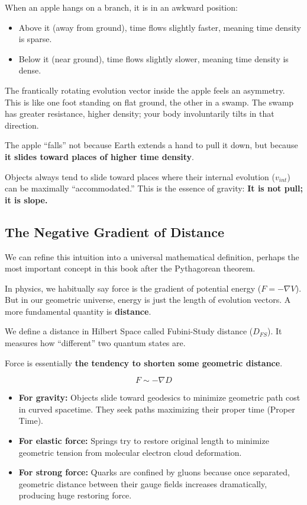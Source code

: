 When an apple hangs on a branch, it is in an awkward position:

\begin{itemize}
\item Above it (away from ground), time flows slightly faster, meaning time density is sparse.

\item Below it (near ground), time flows slightly slower, meaning time density is dense.
\end{itemize}

The frantically rotating evolution vector inside the apple feels an asymmetry. This is like one foot standing on flat ground, the other in a swamp. The swamp has greater resistance, higher density; your body involuntarily tilts in that direction.

The apple ``falls'' not because Earth extends a hand to pull it down, but because \textbf{it slides toward places of higher time density}.

Objects always tend to slide toward places where their internal evolution ($v_{int}$) can be maximally ``accommodated.'' This is the essence of gravity: \textbf{It is not pull; it is slope.}

\subsection{The Negative Gradient of Distance}

We can refine this intuition into a universal mathematical definition, perhaps the most important concept in this book after the Pythagorean theorem.

In physics, we habitually say force is the gradient of potential energy ($F = -\nabla V$). But in our geometric universe, energy is just the length of evolution vectors. A more fundamental quantity is \textbf{distance}.

We define a distance in Hilbert Space called Fubini-Study distance ($D_{FS}$). It measures how ``different'' two quantum states are.

Force is essentially \textbf{the tendency to shorten some geometric distance}.

$$F \sim -\nabla D$$

\begin{itemize}
\item \textbf{For gravity:} Objects slide toward geodesics to minimize geometric path cost in curved spacetime. They seek paths maximizing their proper time (Proper Time).

\item \textbf{For elastic force:} Springs try to restore original length to minimize geometric tension from molecular electron cloud deformation.

\item \textbf{For strong force:} Quarks are confined by gluons because once separated, geometric distance between their gauge fields increases dramatically, producing huge restoring force.
\end{itemize}

